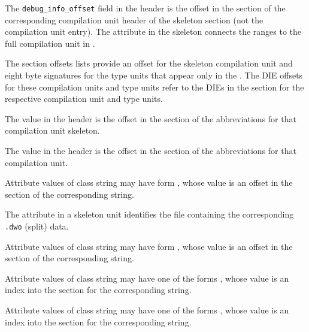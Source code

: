 \begin{description}
The \texttt{debug\_info\_offset} field in the header is the 
offset in the \dotdebuginfo{} section of the corresponding 
compilation unit header of the skeleton \dotdebuginfo{} section 
(not the compilation unit entry).  The \DWATdwoname{} attribute 
in the \dotdebuginfo{} skeleton connects 
the ranges to the full compilation unit in \dotdebuginfodwo.

The \dotdebugnames{} section  offsets lists provide an offset
for the skeleton compilation unit and eight 
byte signatures for the type units that appear only in the 
\dotdebuginfodwo. The DIE offsets for these 
compilation units and type units refer to the DIEs in the 
\dotdebuginfodwo{} section for the respective 
compilation unit and type units.

The \HFNdebugabbrevoffset{} value in the header is 
the offset in the \dotdebugabbrev{} section of the 
abbreviations for that compilation unit skeleton.

The \HFNdebugabbrevoffset{} value in the header 
is the offset in the \dotdebugabbrevdwo{} section of the 
abbreviations for that compilation unit.

Attribute values of class string may have form \DWFORMstrp, 
whose value is an offset in the 
\dotdebugstr{} section of the corresponding string.

The \DWATdwoname{}
attribute in a skeleton unit identifies the file containing 
the corresponding \texttt{.dwo} (split) data. 

Attribute values of class string may have form 
\DWFORMstrp, whose value is an offset in the 
\dotdebugstrdwo{} section of the corresponding string.

Attribute values of class string may have one of the forms
\DWFORMstrxXNor, whose value is an index into the 
\dotdebugstroffsets{} section for the corresponding string.

Attribute values of class string may have one of the forms
\DWFORMstrxXNor, whose value is an index into the 
\dotdebugstroffsetsdwo{} section for the corresponding string.


\end{description}
